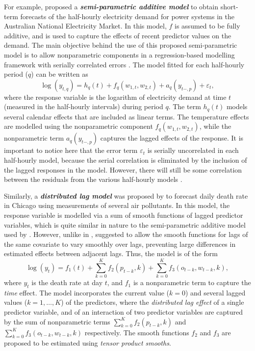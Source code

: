 \documentclass[11pt,a4paper,]{article}
\begin{document}
For example, \textcite{FH2012} proposed a \textbf{\emph{semi-parametric
additive model}} to obtain short-term forecasts of the half-hourly
electricity demand for power systems in the Australian National
Electricity Market. In this model, \(f\) is assumed to be fully
additive, and is used to capture the effects of recent predictor values
on the demand. The main objective behind the use of this proposed
semi-parametric model is to allow nonparametric components in a
regression-based modelling framework with serially correlated errors
\autocite{FH2012}. The model fitted for each half-hourly period (\(q\))
can be written as \[
 \log(y_{t,q}) = h_{q}(t) + f_{q}(w_{1,t},w_{2,t}) + a_{q}(y_{t-,p}) + \varepsilon_{t},
\] where the response variable is the logarithm of electricity demand at
time \(t\) (measured in the half-hourly intervals) during period \(q\).
The term \(h_{q}(t)\) models several calendar effects that are included
as linear terms. The temperature effects are modelled using the
nonparametric component \(f_{q}(w_{1,t},w_{2,t})\), while the
nonparametric term \(a_{q}(y_{t-,p})\) captures the lagged effects of
the response. It is important to notice here that the error term
\(\varepsilon_{t}\) is serially uncorrelated in each half-hourly model,
because the serial correlation is eliminated by the inclusion of the
lagged responses in the model. However, there will still be some
correlation between the residuals from the various half-hourly models
\autocite{FH2012}.

Similarly, a \textbf{\emph{distributed lag model}} was proposed by
\textcite{Wood2017} to forecast daily death rate in Chicago using
measurements of several air pollutants. In this model, the response
variable is modelled via a sum of smooth functions of lagged predictor
variables, which is quite similar in nature to the semi-parametric
additive model used by \textcite{FH2012}. However, unlike in
\textcite{FH2012}, \textcite{Wood2017} suggested to allow the smooth
functions for lags of the same covariate to vary smoothly over lags,
preventing large differences in estimated effects between adjacent lags.
Thus, the model is of the form \[
 \log(y_{t}) = f_{1}(t) + \sum_{k=0}^{K} f_{2}(p_{t-k}, k) + \sum_{k=0}^{K} f_{3}(o_{t-k}, w_{t-k}, k),
\] where \(y_{t}\) is the death rate at day \(t\), and \(f_{1}\) is a
nonparametric term to capture the \emph{time} effect. The model
incorporates the current value (\(k = 0\)) and several lagged values
(\(k = 1, \dots, K\)) of the predictors, where the \emph{distributed lag
effect} of a single predictor variable, and of an interaction of two
predictor variables are captured by the sum of nonparametric terms
\(\sum_{k=0}^{K} f_{2}(p_{t-k}, k)\) and
\(\sum_{k=0}^{K} f_{3}(o_{t-k}, w_{t-k}, k)\) respectively. The smooth
functions \(f_{2}\) and \(f_{3}\) are proposed to be estimated using
\emph{tensor product smooths}.
\end{document}
